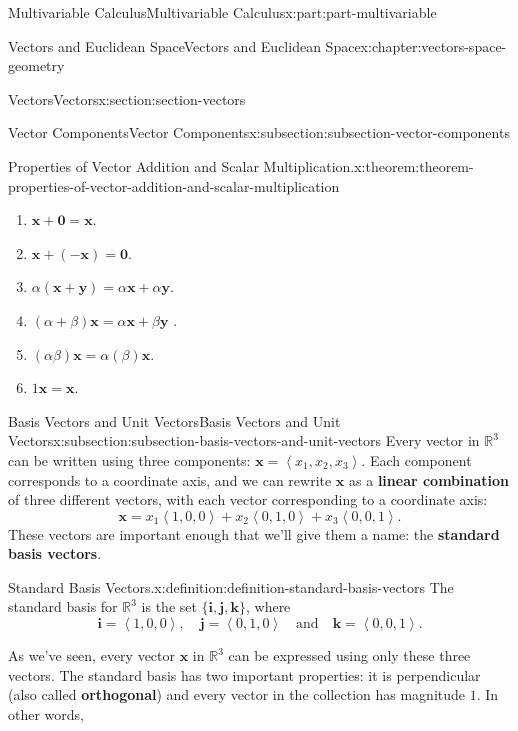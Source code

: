 \documentclass[twoside,10pt,]{tufte-book}
\newcommand{\terminology}[1]{\textbf{#1}}
\numberwithin{equation}{part}
\newcommand{\RR}{\mathbb{R}}
\newcommand{\dotprod}[1]{\left\langle #1 \right\rangle}
\begin{document}
\begin{partptx}{Multivariable Calculus}{}{Multivariable Calculus}{}{}{x:part:part-multivariable}
\begin{chapterptx}{Vectors and Euclidean Space}{}{Vectors and Euclidean Space}{}{}{x:chapter:vectors-space-geometry}
\begin{sectionptx}{Vectors}{}{Vectors}{}{}{x:section:section-vectors}
\begin{subsectionptx}{Vector Components}{}{Vector Components}{}{}{x:subsection:subsection-vector-components}
\begin{theorem}{Properties of Vector Addition and Scalar Multiplication.}{}{x:theorem:theorem-properties-of-vector-addition-and-scalar-multiplication}
\begin{multicols}{2}
\begin{enumerate}
\item{}\(\displaystyle \mathbf{x}+\mathbf{0} = \mathbf{x}.\)%
\item{}\(\displaystyle \mathbf{x}+(-\mathbf{x}) = \mathbf{0}.\)%
\item{}\(\displaystyle \alpha(\mathbf{x}+\mathbf{y}) = \alpha\mathbf{x}+\alpha\mathbf{y}.\)%
\item{}\(\displaystyle (\alpha+\beta)\mathbf{x} = \alpha\mathbf{x}+\beta\mathbf{y}\)%
. \item{}\(\displaystyle (\alpha\beta)\mathbf{x} = \alpha(\beta)\mathbf{x}.\)%
\item{}\(\displaystyle 1\mathbf{x} = \mathbf{x}.\)%
\end{enumerate}
\end{multicols}
\end{theorem}
\end{subsectionptx}
%
%
\typeout{************************************************}
\typeout{************************************************}
%
\begin{subsectionptx}{Basis Vectors and Unit Vectors}{}{Basis Vectors and Unit Vectors}{}{}{x:subsection:subsection-basis-vectors-and-unit-vectors}
Every vector in \(\RR^{3}\) can be written using three components: \(\mathbf{x} = \dotprod{x_{1},x_{2},x_{3}}.\) Each component corresponds to a coordinate axis, and we can rewrite \(\mathbf{x}\) as a \terminology{linear combination} of three different vectors, with each vector corresponding to a coordinate axis:%
%
\begin{equation*}
\mathbf{x} = x_{1}\dotprod{1,0,0}+x_{2}\dotprod{0,1,0}+x_{3}\dotprod{0,0,1}.
\end{equation*}
These vectors are important enough that we'll give them a name: the \terminology{standard basis vectors}. \begin{definition}{Standard Basis Vectors.}{x:definition:definition-standard-basis-vectors}%
%
The standard basis for \(\RR^{3}\) is the set \(\{\mathbf{i},\mathbf{j},\mathbf{k}\}\), where%
%
\begin{equation*}
\mathbf{i} = \dotprod{1,0,0},\quad\mathbf{j} = \dotprod{0,1,0}\quad\text{and}\quad\mathbf{k} = \dotprod{0,0,1}.
\end{equation*}
\end{definition}
As we've seen, every vector \(\mathbf{x}\) in \(\RR^{3}\) can be expressed using only these three vectors. The standard basis has two important properties: it is perpendicular (also called \terminology{orthogonal}) and every vector in the collection has magnitude \(1\). In other words,%

\end{subsectionptx}
\end{sectionptx}
\end{chapterptx}
\end{partptx}
\end{document}
